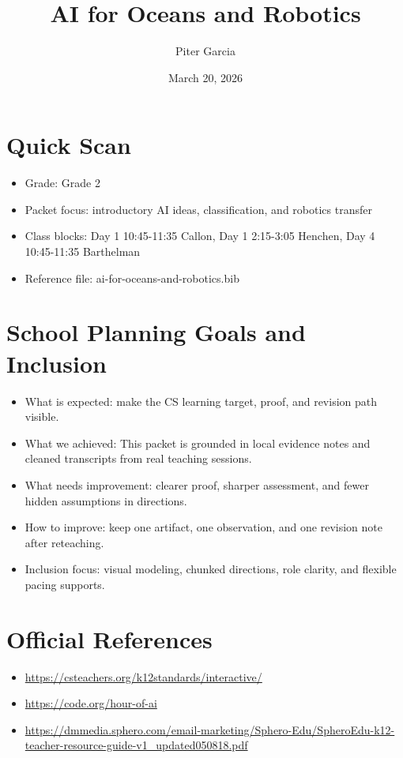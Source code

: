\documentclass[11pt]{article}
\title{AI for Oceans and Robotics}
\author{Piter Garcia}
\date{March 20, 2026}
\begin{document}
\maketitle
\section*{Quick Scan}
\begin{itemize}[leftmargin=*]
\item Grade: Grade 2
\item Packet focus: introductory AI ideas, classification, and robotics transfer
\item Class blocks: Day 1 10:45-11:35 Callon, Day 1 2:15-3:05 Henchen, Day 4 10:45-11:35 Barthelman
\item Reference file: ai-for-oceans-and-robotics.bib
\end{itemize}
\section*{School Planning Goals and Inclusion}
\begin{itemize}[leftmargin=*]
\item What is expected: make the CS learning target, proof, and revision path visible.
\item What we achieved: This packet is grounded in local evidence notes and cleaned transcripts from real teaching sessions.
\item What needs improvement: clearer proof, sharper assessment, and fewer hidden assumptions in directions.
\item How to improve: keep one artifact, one observation, and one revision note after reteaching.
\item Inclusion focus: visual modeling, chunked directions, role clarity, and flexible pacing supports.
\end{itemize}
\section*{Official References}
\begin{itemize}[leftmargin=*]
\item \url{https://csteachers.org/k12standards/interactive/}
\item \url{https://code.org/hour-of-ai}
\item \url{https://dmmedia.sphero.com/email-marketing/Sphero-Edu/SpheroEdu-k12-teacher-resource-guide-v1_updated050818.pdf}
\end{itemize}
\end{document}
